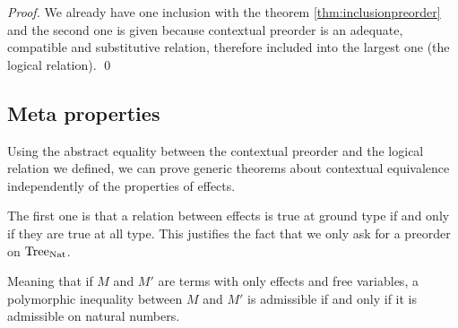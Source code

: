 \begin{atheorem}
\end{atheorem}

\begin{proof}
    We already have one inclusion with the theorem \ref{thm:inclusionpreorder}
    and the second one is given because 
    contextual preorder is an adequate, compatible and substitutive relation,
    therefore included into the largest one (the logical relation).
\qed\end{proof}

\subsection{Meta properties}

Using the abstract equality between the contextual preorder
and the logical relation we defined, we can prove generic 
theorems about contextual equivalence independently 
of the properties of effects.

The first one is that a relation between effects is true 
at ground type if and only if they are true at all type. This 
justifies the fact that we only ask for a preorder on $\textnormal{Tree}_{\textnormal{Nat}}$.

\begin{atheorem}
    Meaning that if $M$ and $M'$ are terms with only effects and free 
    variables, a polymorphic inequality between $M$ and $M'$ is 
    admissible if and only if it is admissible on natural numbers. 
\end{atheorem}

